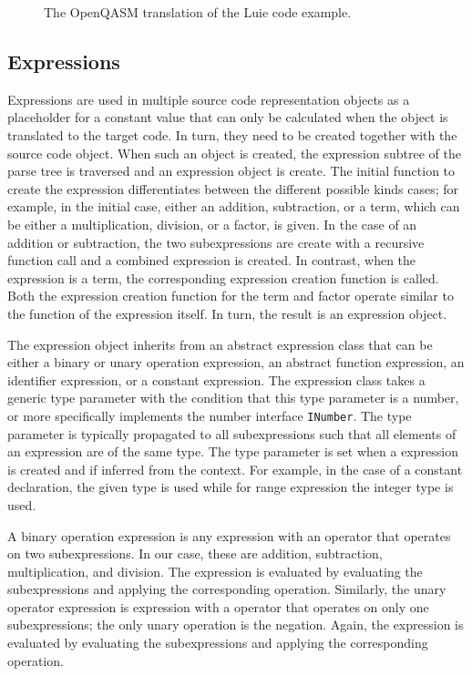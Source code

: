 \begin{figure}
    \centering
    
    \caption{The OpenQASM translation of the Luie code example.}
    \label{fig:codeGen_target_example}
\end{figure}


\subsection{Expressions}
\label{sec:implementation_expression}
Expressions are used in multiple source code representation objects as a placeholder for a constant value that can only be calculated when the object is translated to the target code. In turn, they need to be created together with the source code object. When such an object is created, the expression subtree of the parse tree is traversed and an expression object is create. The initial function to create the expression differentiates between the different possible kinds cases; for example, in the initial case, either an addition, subtraction, or a term, which can be either a multiplication, division, or a factor, is given. In the case of an addition or subtraction, the two subexpressions are create with a recursive function call and a combined expression is created. In contrast, when the expression is a term, the corresponding expression creation function is called. Both the expression creation function for the term and factor operate similar to the function of the expression itself. In turn, the result is an expression object. 

The expression object inherits from an abstract expression class that can be either a binary or unary operation expression, an abstract function expression, an identifier expression, or a constant expression. The expression class takes a generic type parameter with the condition that this type parameter is a number, or more specifically implements the number interface \texttt{INumber}. The type parameter is typically propagated to all subexpressions such that all elements of an expression are of the same type. The type parameter is set when a expression is created and if inferred from the context. For example, in the case of a constant declaration, the given type is used while for range expression the integer type is used.    

A binary operation expression is any expression with an operator that operates on two subexpressions. In our case, these are addition, subtraction, multiplication, and division. The expression is evaluated by evaluating the subexpressions and applying the corresponding operation. Similarly, the unary operator expression is expression with a operator that operates on only one subexpressions; the only unary operation is the negation. Again, the expression is evaluated by evaluating the subexpressions and applying the corresponding operation. 

